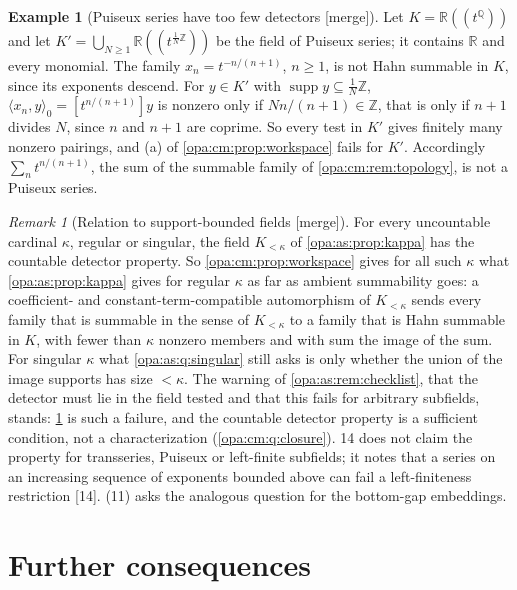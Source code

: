 \documentclass[11pt,oneside]{article}
\numberwithin{equation}{section}
\theoremstyle{definition}
\newtheorem{example}[example]{Example}
\theoremstyle{remark}
\newtheorem{remark}[remark]{Remark}
\newcommand{\R}{\mathbb R}
\newcommand{\Q}{\mathbb Q}
\newcommand{\Z}{\mathbb Z}
\newcommand{\supp}{\operatorname{supp}}
\newcommand{\Hahn}[2]{#1((t^{#2}))}
\newcommand{\coef}[2]{[t^{#1}]#2}
\newcommand{\src}[1]{\textup{\textsf{\small[#1]}}}
\newcommand{\mergetag}{\textup{\textsf{\small[merge]}}}
\newcommand{\pairing}[2]{\langle #1,#2\rangle_0}
\begin{document}
\begin{example}[Puiseux series have too few detectors \mergetag]\label{opa:cm:ex:puiseux}
Let $K=\Hahn\R\Q$ and let $K'=\bigcup_{N\ge1}\Hahn\R{\tfrac1N\Z}$ be the field of Puiseux series; it
contains $\R$ and every monomial. The family $x_n=t^{-n/(n+1)}$, $n\ge1$, is not Hahn summable
in $K$, since its exponents descend. For $y\in K'$ with $\supp y\subseteq\frac1N\Z$,
$\pairing{x_n}y=\coef{n/(n+1)}y$ is nonzero only if $Nn/(n+1)\in\Z$, that is only if $n+1$
divides $N$, since $n$ and $n+1$ are coprime. So every test in $K'$ gives finitely many nonzero
pairings, and (a) of \cref{opa:cm:prop:workspace} fails for $K'$. Accordingly
$\sum_nt^{n/(n+1)}$, the sum of the summable family of \cref{opa:cm:rem:topology}, is not a
Puiseux series.
\end{example}

\begin{remark}[Relation to support-bounded fields \mergetag]\label{opa:cm:rem:kappa}
For every uncountable cardinal $\kappa$, regular or singular, the field $K_{<\kappa}$ of
\cref{opa:as:prop:kappa} has the countable detector property. So
\cref{opa:cm:prop:workspace} gives for all such $\kappa$ what \cref{opa:as:prop:kappa} gives for
regular $\kappa$ as far as ambient summability goes: a coefficient- and constant-term-compatible
automorphism of $K_{<\kappa}$ sends every family that is summable in the sense of $K_{<\kappa}$ to a
family that is Hahn summable in $K$, with fewer than $\kappa$ nonzero members and with sum the
image of the sum. For singular $\kappa$ what \cref{opa:as:q:singular} still asks is only
whether the union of the image supports has size $<\kappa$. The warning of
\cref{opa:as:rem:checklist}, that the detector must lie in the field tested and that this
fails for arbitrary subfields, stands: \cref{opa:cm:ex:puiseux} is such a failure, and the
countable detector property is a sufficient condition, not a characterization
(\cref{opa:cm:q:closure}). 14 does not claim the property for transseries, Puiseux or
left-finite subfields; it notes that a series on an increasing sequence of exponents bounded
above can fail a left-finiteness restriction \src{14}.  (11) asks
the analogous question for the bottom-gap embeddings.
\end{remark}

\section{Further consequences}\label{opa:cm:sec:further}
\end{document}
